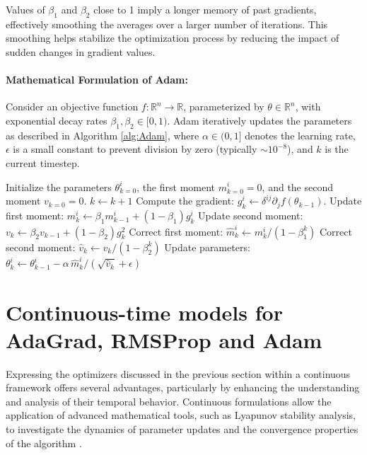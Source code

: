 \documentclass{article} %
\begin{document}
Values of \( \beta_1 \) and \( \beta_2 \) close to 1 imply a longer memory of past gradients, effectively smoothing the averages over a larger number of iterations. This smoothing helps stabilize the optimization process by reducing the impact of sudden changes in gradient values.

\paragraph{Mathematical Formulation of Adam:} Consider an objective function \( f: \mathbb{R}^n \to \mathbb{R} \), parameterized by \( \theta \in \mathbb{R}^n \), with exponential decay rates \( \beta_1, \beta_2 \in [0,1) \). Adam iteratively updates the parameters as described in Algorithm \ref{alg:Adam}, where \( \alpha \in (0,1] \) denotes the learning rate, \( \epsilon \) is a small constant to prevent division by zero (typically \( \sim 10^{-8} \)), and \( k \) is the current timestep.

\begin{algorithm}
\caption{Adam Optimization Algorithm}
\label{alg:Adam}
\begin{algorithmic}[1] 
    \State Initialize the parameters $\theta^i_{k=0}$, the first moment $m^i_{k=0} = 0$, and the second moment $v_{k=0} = 0$.
        \State $k \leftarrow k + 1$
        \State Compute the gradient: $g^i_{k} \leftarrow \delta^{ij} \partial_j f(\theta_{k-1})$.
        \State Update first moment: $m^i_{k} \leftarrow \beta_1 m^i_{k-1} + (1 - \beta_1) g^i_{k}$
        \State Update second moment: $v_{k} \leftarrow \beta_2 v_{k-1} + (1 - \beta_2) g_{k}^2$
        \State Correct first moment: $\hat{m}^i_{k} \leftarrow m^i_{k}/(1 - \beta_1^k)$
        \State Correct second moment: $\hat{v}_{k} \leftarrow v_{k}/(1 - \beta_2^k)$
        \State Update parameters: $\theta^i_{k} \leftarrow \theta^i_{k-1} - \alpha\, \hat{m}^i_{k}/(\sqrt{\hat{v}_{k}} + \epsilon)$
    \EndWhile
\end{algorithmic}
\end{algorithm}

\section{Continuous-time models for AdaGrad, RMSProp and Adam}\label{sec:Continuous}
Expressing the optimizers discussed in the previous section within a continuous framework offers several advantages, particularly by enhancing the understanding and analysis of their temporal behavior. Continuous formulations allow the application of advanced mathematical tools, such as Lyapunov stability analysis, to investigate the dynamics of parameter updates and the convergence properties of the algorithm \cite{kovachki2021continuous}.
\end{document}
